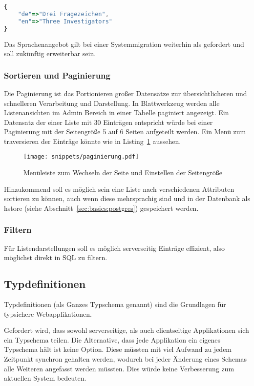 \begin{lstlisting}[language=JavaScript,float=h!,caption={Speicherung der Projektnamen als jsonb}, label={sec:requirements:multilang}]
{
    "de"=>"Drei Fragezeichen",
    "en"=>"Three Investigators"
}
\end{lstlisting}

Das Sprachenangebot gilt bei einer Systemmigration weiterhin als gefordert und soll zukünftig erweiterbar sein.

\subsubsection{Sortieren und Paginierung}
Die Paginierung ist das Portionieren großer Datensätze zur übersichtlicheren und schnelleren Verarbeitung und Darstellung.
In Blattwerkzeug werden alle Listenansichten im Admin Bereich in einer Tabelle paginiert angezeigt.
Ein Datensatz der einer Liste mit 30 Einträgen entspricht würde bei einer Paginierung mit der Seitengröße 5 auf 6 Seiten aufgeteilt werden.
Ein Menü zum traversieren der Einträge könnte wie in Listing~\ref{req:view:pagination} aussehen.

\begin{figure}[h!]
    \centering
    \texttt{[image: snippets/paginierung.pdf]}
    \caption{Menüleiste zum Wechseln der Seite und Einstellen der Seitengröße}
    \label{req:view:pagination}
\end{figure}

Hinzukommend soll es möglich sein eine Liste nach verschiedenen Attributen sortieren zu können, auch wenn diese mehrsprachig sind und
in der Datenbank als hstore (siehe Abschnitt~\ref{sec:basics:postgres}) gespeichert werden.

\subsubsection{Filtern}

Für Listendarstellungen soll es möglich serverseitig Einträge effizient, also möglichst direkt in SQL zu filtern.


\subsection{Typdefinitionen}

Typdefinitionen (als Ganzes Typschema genannt) sind die Grundlagen für typsichere Webapplikationen.

Gefordert wird, dass sowohl serverseitige, als auch clientseitige Applikationen sich ein Typschema teilen. 
Die Alternative, dass jede Applikation ein eigenes Typschema hält ist keine Option. Diese müssten mit viel Aufwand zu jedem Zeitpunkt synchron gehalten werden, wodurch bei jeder Änderung eines Schemas alle Weiteren angefasst werden müssten. Dies würde keine Verbesserung zum aktuellen System bedeuten.

